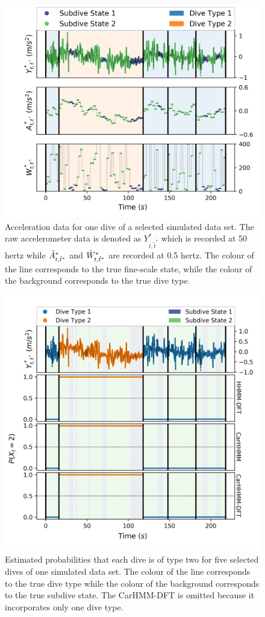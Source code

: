 \begin{figure}[ht]
	\centering
	\includegraphics[width=5in]{../Plots/sim_data.png}
	\caption{Acceleration data for one dive of a selected simulated data set. The raw accelerometer data is denoted as $Y^*_{t,\tilde t^*}$ which is recorded at 50 hertz while $\tilde{A}^*_{t,\tilde t^*}$ and $\tilde{W}^*_{t,\tilde t^*}$ are recorded at 0.5 hertz. The colour of the line corresponds to the true fine-scale state, while the colour of the background corresponds to the true dive type.}
	\label{fig:sim_data}
\end{figure}

\begin{figure}[ht]
    \centering
    \includegraphics[width=4.5in]{../Plots/Posterior_Coarse_States.png}
    \caption{Estimated probabilities that each dive is of type two for five selected dives of one simulated data set. The colour of the line corresponds to the true dive type while the colour of the background corresponds to the true subdive state. The CarHMM-DFT is omitted because it incorporates only one dive type.}
    \label{fig:acc_coarse}
\end{figure}

